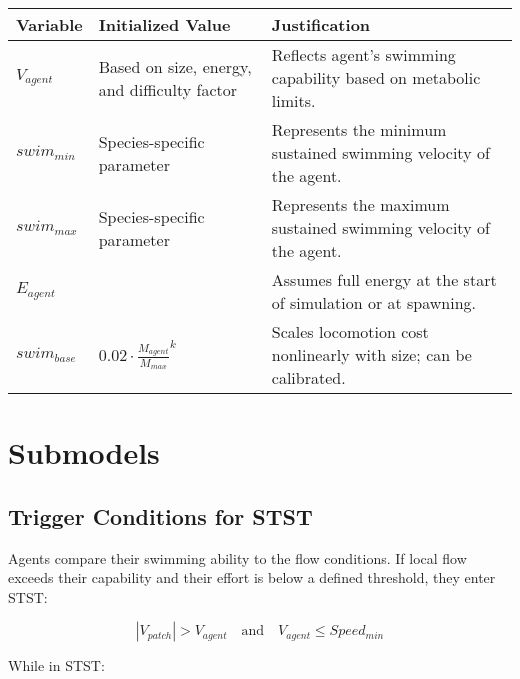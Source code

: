 \documentclass[
]{book}
\begin{document}
\begin{longtable}[]{@{}
  >{\centering\arraybackslash}p{}
  >{\centering\arraybackslash}p{}
  >{\centering\arraybackslash}p{}@{}}
\toprule\noalign{}
\begin{minipage}[b]{\linewidth}\centering
Variable
\end{minipage} & \begin{minipage}[b]{\linewidth}\centering
Initialized Value
\end{minipage} & \begin{minipage}[b]{\linewidth}\centering
Justification
\end{minipage} \\
\midrule\noalign{}
\endhead
\bottomrule\noalign{}
\endlastfoot
\(V_{agent}\) & Based on size, energy, and difficulty factor & Reflects agent's swimming capability based on metabolic limits. \\
\(swim_{min}\) & Species-specific parameter & Represents the minimum sustained swimming velocity of the agent. \\
\(swim_{max}\) & Species-specific parameter & Represents the maximum sustained swimming velocity of the agent. \\
\(E_{agent}\) & 100 & Assumes full energy at the start of simulation or at spawning. \\
\(swim_{base}\) & \(0.02 \cdot \frac{M_{agent}}{M_{max}}^{k}\) & Scales locomotion cost nonlinearly with size; can be calibrated. \\
\end{longtable}

\section{Submodels}\label{submodels-5}

\subsection{Trigger Conditions for STST}\label{trigger-conditions-for-stst}

Agents compare their swimming ability to the flow conditions. If local flow exceeds their capability and their effort is below a defined threshold, they enter STST:

\[
|V_{patch}| > V_{agent} \quad \text{and} \quad V_{agent} \leq Speed_{min}
\]

While in STST:
\end{document}
